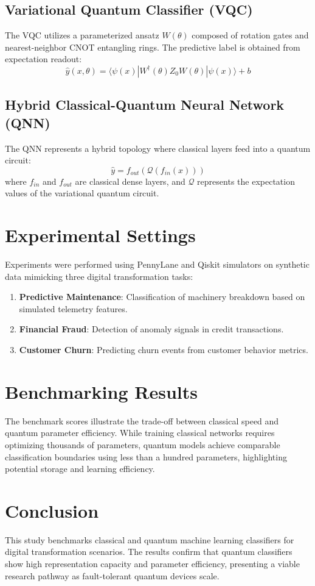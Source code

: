 \documentclass[journal]{IEEEtran}
\begin{document}
\subsection{Variational Quantum Classifier (VQC)}
The VQC utilizes a parameterized ansatz $W(\theta)$ composed of rotation gates and nearest-neighbor CNOT entangling rings. The predictive label is obtained from expectation readout:
\begin{equation}
\hat{y}(x, \theta) = \langle \psi(x) | W^\dagger(\theta) Z_0 W(\theta) | \psi(x) \rangle + b
\end{equation}

\subsection{Hybrid Classical-Quantum Neural Network (QNN)}
The QNN represents a hybrid topology where classical layers feed into a quantum circuit:
\begin{equation}
\hat{y} = f_{out} \left( \mathcal{Q}\left( f_{in}(x) \right) \right)
\end{equation}
where $f_{in}$ and $f_{out}$ are classical dense layers, and $\mathcal{Q}$ represents the expectation values of the variational quantum circuit.

\section{Experimental Settings}
Experiments were performed using PennyLane and Qiskit simulators on synthetic data mimicking three digital transformation tasks:
\begin{enumerate}
    \item \textbf{Predictive Maintenance}: Classification of machinery breakdown based on simulated telemetry features.
    \item \textbf{Financial Fraud}: Detection of anomaly signals in credit transactions.
    \item \textbf{Customer Churn}: Predicting churn events from customer behavior metrics.
\end{enumerate}

\section{Benchmarking Results}
The benchmark scores illustrate the trade-off between classical speed and quantum parameter efficiency. While training classical networks requires optimizing thousands of parameters, quantum models achieve comparable classification boundaries using less than a hundred parameters, highlighting potential storage and learning efficiency.

\section{Conclusion}
This study benchmarks classical and quantum machine learning classifiers for digital transformation scenarios. The results confirm that quantum classifiers show high representation capacity and parameter efficiency, presenting a viable research pathway as fault-tolerant quantum devices scale.



\end{document}
